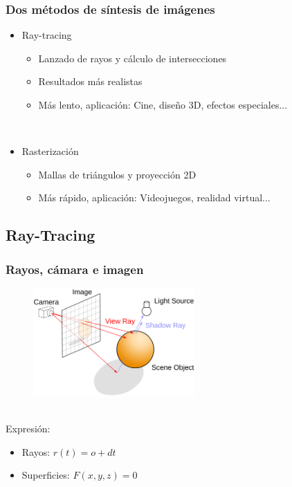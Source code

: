\documentclass{beamer}
\begin{document}
	\begin{frame}
		\frametitle{Dos métodos de síntesis de imágenes}
		\begin{itemize}
			\item Ray-tracing
				\begin{itemize}
					\item Lanzado de rayos y cálculo de intersecciones
					\item Resultados más realistas
					\item Más lento, aplicación: Cine, diseño 3D, efectos especiales...
				\end{itemize}
				${ }$\\
			\item Rasterización
				\begin{itemize}
					\item Mallas de triángulos y proyección 2D
					\item Más rápido, aplicación: Videojuegos, realidad virtual...
				\end{itemize}
		\end{itemize}
	\end{frame}
	
	\subsection{Ray-Tracing}
	
	\begin{frame}
		\frametitle{Rayos, cámara e imagen}
		\begin{figure}[h]
			\begin{center}
				\includegraphics[width=0.55\textwidth]{imagenes/tracing}
			\end{center}
		\end{figure}
		${ }$\\
		Expresión:
		\begin{itemize}
			\item Rayos: $r(t)=o+dt$
			\item Superficies: $F(x,y,z)=0$
		\end{itemize}
	\end{frame}
	
\end{document}
